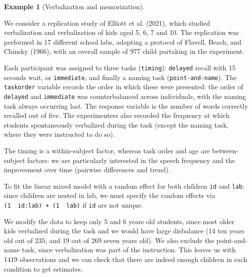 \documentclass[
  11pt,
  letterpaper,
]{scrbook}
\theoremstyle{definition}
\newtheorem{example}{Example}[chapter]
\theoremstyle{definition}
\theoremstyle{remark}
\begin{document}
\begin{example}[Verbalization and
memorization]\protect\hypertarget{exm-verbalization-memorization}{}\label{exm-verbalization-memorization}

We consider a replication study of Elliott et al. (2021), which studied
verbalization and verbalization of kids aged 5, 6, 7 and 10. The
replication was performed in 17 different school labs, adapting a
protocol of Flavell, Beach, and Chinsky (1966), with an overall sample
of 977 child partaking in the experiment.

Each participant was assigned to three tasks (\texttt{timing}):
\texttt{delayed} recall with 15 seconds wait, or \texttt{immediate}, and
finally a naming task (\texttt{point-and-name}). The \texttt{taskorder}
variable records the order in which these were presented: the order of
\texttt{delayed} and \texttt{immediate} was counterbalanced across
individuals, with the naming task always occurring last. The response
variable is the number of words correctly recalled out of five. The
experimenters also recorded the frequency at which students
spontaneously verbalized during the task (except the naming task, where
they were instructed to do so).

The timing is a within-subject factor, whereas task order and age are
between-subject factors: we are particularly interested in the speech
frequency and the improvement over time (pairwise differences and
trend).

To fit the linear mixed model with a random effect for both children
\texttt{id} and \texttt{lab}: since children are nested in lab, we must
specify the random effects via
\texttt{(1\ \textbar{}\ id:lab)\ +\ (1\ \textbar{}\ lab)} if \texttt{id}
are not unique.

We modify the data to keep only 5 and 6 years old students, since most
older kids verbalized during the task and we would have large disbalance
(14 ten years old out of 235, and 19 out of 269 seven years old). We
also exclude the point-and-name task, since verbalization was part of
the instruction. This leaves us with 1419 observations and we can check
that there are indeed enough children in each condition to get
estimates.


\end{example}
\end{document}
